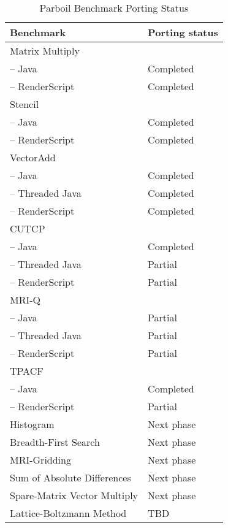 \begin{table}[h]\small
\centering
\begin{tabular}{ | l | p{2cm} |}
    \hline 
    Benchmark & Porting status \\ \hline
    Matrix Multiply & \\
    \hspace{0.5cm}-- Java & Completed \\
    \hspace{0.5cm}-- RenderScript & Completed \\ \hline
    Stencil & \\
    \hspace{0.5cm}-- Java & Completed \\
    \hspace{0.5cm}-- RenderScript & Completed \\ \hline
    VectorAdd & \\
    \hspace{0.5cm}-- Java & Completed \\
    \hspace{0.5cm}-- Threaded Java & Completed \\
    \hspace{0.5cm}-- RenderScript & Completed \\ \hline
    CUTCP & \\
    \hspace{0.5cm}-- Java & Completed \\
    \hspace{0.5cm}-- Threaded Java & Partial \\
    \hspace{0.5cm}-- RenderScript & Partial \\ \hline
    MRI-Q & \\
    \hspace{0.5cm}-- Java & Partial \\
    \hspace{0.5cm}-- Threaded Java & Partial \\
    \hspace{0.5cm}-- RenderScript & Partial \\ \hline
    TPACF & \\
    \hspace{0.5cm}-- Java & Completed \\
    \hspace{0.5cm}-- RenderScript & Partial \\ \hline  
    Histogram & Next phase \\ \hline
    Breadth-First Search & Next phase\\ \hline
    MRI-Gridding & Next phase \\ \hline
    Sum of Absolute Differences & Next phase \\ \hline
    Spare-Matrix Vector Multiply & Next phase \\ \hline
    Lattice-Boltzmann Method & TBD \\ \hline
    \hline
\end{tabular}
\caption{Parboil Benchmark Porting Status}
\label{table:parboil}
\end{table}
